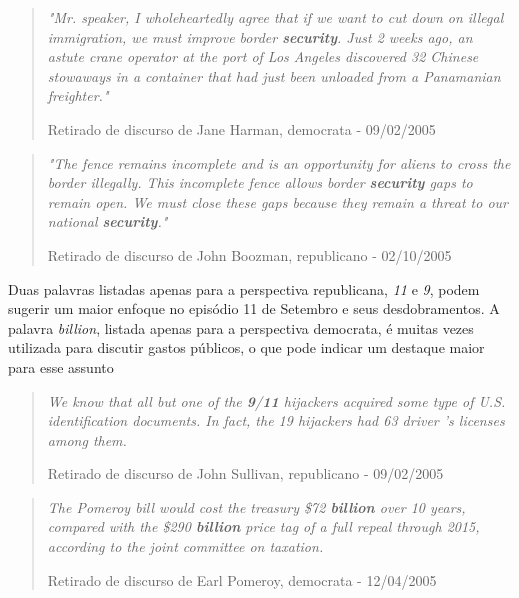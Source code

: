 \begin{quote}
\emph{"Mr. speaker, I wholeheartedly agree that if we want to cut down on illegal immigration, we must improve border \textbf{security}. Just 2 weeks ago, an astute crane operator at the port of Los Angeles discovered 32 Chinese stowaways in a container that had just been unloaded from a Panamanian freighter."} 

{\small Retirado de discurso de Jane Harman, democrata - 09/02/2005 }

\end{quote}

\begin{quote}
\emph{"The fence remains incomplete and is an opportunity for aliens to cross the border illegally. This incomplete fence allows border \textbf{security} gaps to remain open.  We must close these gaps because they remain a threat to our national \textbf{security}."}

{\small Retirado de discurso de John Boozman, republicano - 02/10/2005}

\end{quote}

Duas palavras listadas apenas para a perspectiva republicana, \emph{11} e \emph{9}, podem sugerir um maior enfoque no episódio 11 de Setembro e seus desdobramentos. A palavra \emph{billion}, listada apenas para a perspectiva democrata, é muitas vezes utilizada para discutir gastos públicos, o que pode indicar um destaque maior para esse assunto

\begin{quote}
\emph{We know that all but one of the \textbf{9}/\textbf{11} hijackers acquired some type of U.S. identification documents. In fact, the 19 hijackers had 63 driver 's licenses among them.}

{\small Retirado de discurso de John Sullivan, republicano - 09/02/2005} 
\end{quote}

\begin{quote}
\emph{The Pomeroy bill would cost the treasury \$72 \textbf{billion} over 10 years, compared with the \$290 \textbf{billion} price tag of a full repeal through 2015, according to the joint committee on taxation.}

{\small Retirado de discurso de Earl Pomeroy, democrata - 12/04/2005}
\end{quote}

